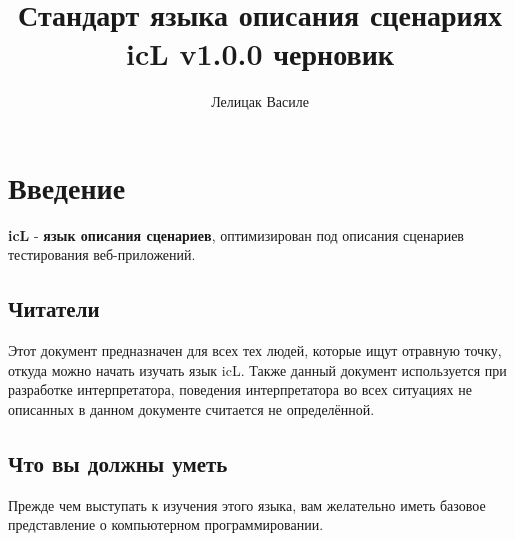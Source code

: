 \documentclass[a4paper, 14pt]{extarticle}
\begin{document}
\newcommand{\stableuni}[6]{
	\begin{longtable}[h]{#1}
	\caption*{Таблица \thetable{}: #4} \label{#3} \\

	\hline
	#2
	\hline
	\endfirsthead

	\multicolumn{3}{l}%
	{{Продолжение таблицы \thetable{}: #4}} \\
	\hline
	#2
	\hline
	\endhead

	\hline
	\endfoot

	\hline
	\endlastfoot
#5
	\end{longtable}
}


\title{Стандарт языка описания сценариях icL v1.0.0 черновик}
\author{Лелицак Василе}

\maketitle

\newpage
\renewcommand{\contentsname}{\textsf{Оглавление}}
\tableofcontents
	
\newpage

\section{Введение}	
	
\indent \textbf{icL} - \textbf{язык описания сценариев}, оптимизирован под описания сценариев тестирования веб-приложений.
	
\subsection{Читатели}
	
	Этот документ предназначен для всех тех людей, которые ищут отравную точку, откуда можно начать изучать язык icL. Также данный документ используется при разработке интерпретатора, поведения интерпретатора во всех ситуациях не описанных в данном документе считается не определённой.
	
\subsection{Что вы должны уметь}
	
Прежде чем выступать к изучения этого языка, вам желательно иметь базовое представление о компьютерном программировании.
	
\end{document}
